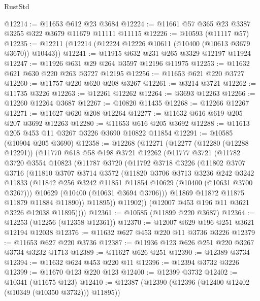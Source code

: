 \begin{lexlean}{RustStd}
\begin{coremodule}
@12214 := @11653 @612 @23 @3684
@12224 := @11661 @57 @365 @23 @3387 @3255 @322 @3679 @11679 @11111 @11115
@12226 := @10593 (@11117 @57)
@12235 := @12211 (@12214 (@12224 @12226 @10611 (@10400 (@10613 @3679 @3670)) @10443))
@12241 := @11915 @632 @231 @265 @3329 @12197 @11924
@12247 := @11926 @631 @29 @264 @3597 @12196 @11975
@12253 := @11632 @621 @630 @220 @263 @3727 @12195
@12256 := @11653 @621 @220 @3727
@12260 := @11757 @220 @620 @208 @3267
@12261 := @3214 @3721
@12262 := @11735 @3226
@12263 := @12261 @12262
@12264 := @3693 @12263
@12266 := @12260 @12264 @3687
@12267 := @10820 @11435
@12268 := @12266 @12267
@12271 := @11627 @620 @208 @12264
@12277 := @11632 @616 @619 @205 @207 @3692 @12263
@12280 := @11653 @616 @205 @3692
@12288 := @11613 @205 @453 @11 @3267 @3226 @3690 @10822 @11854
@12291 := @10585 (@10904 @205 @3690)
@12358 := @12268
    (@12271
      (@12277
        (@12280 (@12288 @12291))
        (@11770
          @618
          @58
          @198
          @3721
          @12262
          (@11777
            @3721
            (@11782
              @3720
              @3554
              @10823
              (@11787
                @3720
                (@11792
                  @3718
                  @3226
                  (@11802
                    @3707
                    @3716
                    (@11810
                      @3707
                      @3714
                      @3572
                      (@11820
                        @3706
                        @3713
                        @3236
                        @242
                        @3242
                        @11833
                        (@11842 @256 @3242 @11851 @11854 @10629 (@10400 (@10631 @3700 @3267)))
                        @10629
                        (@10400 (@10631 @3694 @3706)))
                      @11869
                      @11872
                      @11875
                      @11879
                      @11884
                      @11890))
                  @11895))
              @11902))
          (@12007 @453 @196 @11 @3621 @3226 @12038 @11895))))
@12361 := @10585 (@11899 @220 @3687)
@12364 := @12253 (@12256 (@12358 @12361))
@12370 := @12007 @629 @196 @251 @3621 @12194 @12038
@12376 := @11632 @627 @453 @220 @11 @3736 @3226
@12379 := @11653 @627 @220 @3736
@12387 := @11936 @123 @626 @251 @220 @3267 @3734 @3232 @1713
@12389 := @11627 @626 @251
@12390 := @12389 @3734
@12394 := @11632 @624 @453 @220 @11
@12396 := @12394 @3732 @3226
@12399 := @11670 @123 @220 @123
@12400 := @12399 @3732
@12402 := @10341 (@11675 @123)
@12410 := @12387 (@12390 (@12396 (@12400 @12402 (@10349 (@10350 @3732))) @11895))

\end{coremodule}
\end{lexlean}

